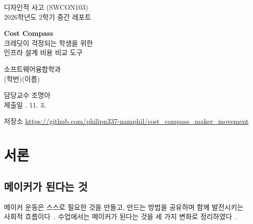 \documentclass[10pt,a4paper]{article}
\newcommand{\studentid}{(학번)}
\newcommand{\studentname}{(이름)}
\begin{document}
\begin{titlepage}
\centering
\vspace*{2.5cm}

{\large 디자인적 사고 (SWCON103)}\\[0.4cm]
{\large 2026학년도 2학기 중간 레포트}

\vspace{3.0cm}

{\Huge\bfseries Cost Compass}\\[1.0cm]
{\LARGE 크레딧이 걱정되는 학생을 위한}\\[0.35cm]
{\LARGE 인프라 설계 비용 비교 도구}

\vspace{3.5cm}

{\large 소프트웨어융합학과}\\[0.4cm]
{\large \studentid \quad \studentname}

\vspace{2.0cm}

{\large 담당교수 \quad 조명아}\\[0.3cm]
{\large 제출일 . 11. 3.}

\vspace{1.2cm}

{\small 저장소 \quad \url{https://github.com/philipn337-namphil/cost_compass_maker_movement}}

\vfill
\end{titlepage}

\newpage
\tableofcontents
\thispagestyle{empty}

\newpage
\setcounter{page}{1}

\section{서론}

\subsection{메이커가 된다는 것}

메이커 운동은 스스로 필요한 것을 만들고, 만드는 방법을 공유하며 함께 발전시키는 사회적 흐름이다~\cite{anderson2012, dougherty2012}. 수업에서는 메이커가 된다는 것을 세 가지 변화로 정리하였다~\cite{cho2026}.
\end{document}
